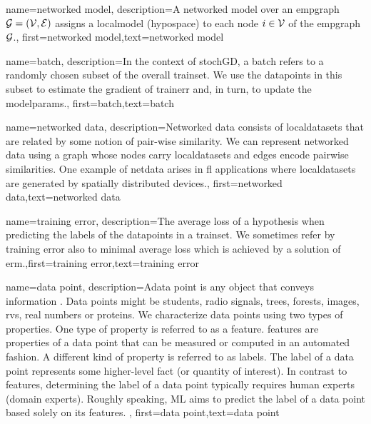 {name={networked model},
  description={A networked model over an \gls{empgraph} $\mathcal{G} = \left( \mathcal{V},\mathcal{E} \right)$ assigns 
   a \gls{localmodel} (\gls{hypospace}) to each node $i \in \mathcal{V}$ of the \gls{empgraph} $\mathcal{G}$.}, 
   first={networked model},text={networked model}  
}

{
	name={batch},
	description={In the context of \gls{stochGD}, a batch refers to a randomly 
	chosen subset of the overall \gls{trainset}. We use the \gls{datapoint}s in this subset 
	to estimate the \gls{gradient} of \gls{trainerr} and, in turn, to update the \gls{modelparams}.}, 
	first={batch},text={batch}  
}

{
	name={networked data},
	description={Networked data consists of \gls{localdataset}s 
	that are related by some notion of pair-wise similarity. We can represent networked 
	data using a \gls{graph} whose nodes carry \gls{localdataset}s and edges encode 
	pairwise similarities. One example of \gls{netdata} arises in \gls{fl} applications 
	where \gls{localdataset}s are generated by spatially distributed devices.}, 
	first={networked data},text={networked data}  
}

{
	name={training error},
	description={The average \gls{loss} of a \gls{hypothesis} when 
		predicting the \gls{label}s of the \gls{datapoint}s in a \gls{trainset}. 
		We sometimes refer by training error also to minimal average \gls{loss} 
		which is achieved by a solution of \gls{erm}.},first={training error},text={training error}  
}

{name={data point},
description={Adata point is any object that conveys information \cite{coverthomas}. Data points might be 
		students, radio signals, trees, forests, images, \gls{rv}s, real numbers or proteins. We characterize data points 
		using two types of properties. One type of property is referred to as a \gls{feature}. \Gls{feature}s are properties of a 
		data point that can be measured or computed in an automated fashion. 
		A different kind of property is referred to as \gls{label}s. The \gls{label} of 
		a data point represents some higher-level fact (or quantity of interest). In 
		contrast to \gls{feature}s, determining the \gls{label} of a data point typically 
		requires human experts (domain experts). Roughly speaking, ML aims to predict 
		the \gls{label} of a data point based solely on its \gls{feature}s. 
		}, first={data point},text={data point}  
}


